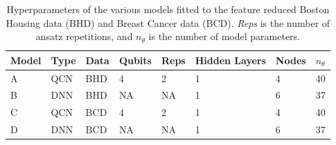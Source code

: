 \begin{table}[H]
\centering
\caption{Hyperparameters of the various models fitted to the feature reduced Boston Housing data (BHD) and Breast Cancer data (BCD). \emph{Reps} is the number of ansatz repetitions, and $n_{\theta}$ is the number of model parameters.} 
\begin{tabular}{|l|l|l|l|l|l|l|l|}
\hline
Model& Type& Data& Qubits& Reps& Hidden Layers & Nodes &$n_{\theta}$ \\ \hline
A    & QCN & BHD  & 4     & 2  &1     & 4& 40   \\ \hline
B    & DNN & BHD  & NA    & NA &1     & 6& 37 \\ \Xhline{2\arrayrulewidth}
C    & QCN & BCD        & 4     & 2  &1     & 4& 40  \\ \hline
D    & DNN & BCD        & NA    & NA &1     & 6& 37  \\ \hline
\end{tabular}

\label{tab:training models PCA}
\end{table}

